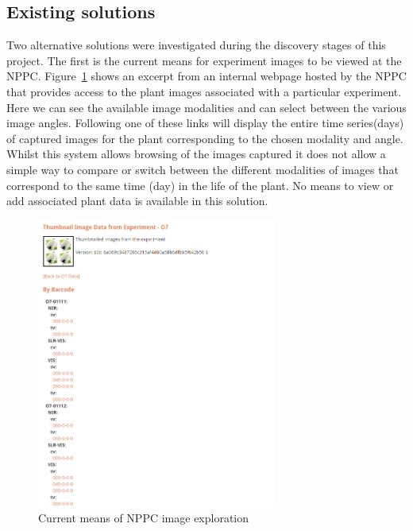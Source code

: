 
 
 
  

\subsection{Existing solutions}
Two alternative solutions were investigated during the discovery stages of this project. The first is the current means for experiment images to be viewed at the NPPC. Figure~\ref{fig:acc_phe} shows an excerpt from an internal webpage hosted by the NPPC that provides access to the plant images associated with a particular experiment. Here we can see the available image modalities and can select between the various image angles. Following one of these links will display the entire time series(days) of captured images for the plant corresponding to the chosen modality and angle. Whilst this system allows browsing of the images captured it does not allow a simple way to compare or switch between the different modalities of images that correspond to the same time (day) in the life of the plant. No means to view or add associated plant data is available in this solution.

\begin{figure}[H]
    \centering
    \includegraphics[width=0.7\textwidth]{images/background/access_phen}
    \caption{Current means of NPPC image exploration}
    \label{fig:acc_phe}
\end{figure}

